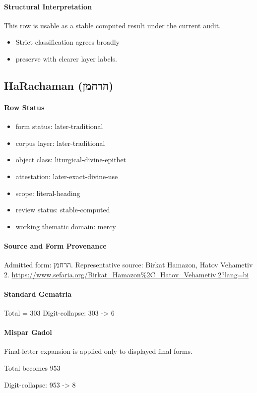 \paragraph{Structural Interpretation}
This row is usable as a stable computed result under the current audit.

\begin{itemize}
\item Strict classification agrees broadly
\item preserve with clearer layer labels.
\end{itemize}

\subsection{HaRachaman (הרחמן)}
\paragraph{Row Status}
\begin{itemize}
\item form status: later-traditional
\item corpus layer: later-traditional
\item object class: liturgical-divine-epithet
\item attestation: later-exact-divine-use
\item scope: literal-heading
\item review status: stable-computed
\item working thematic domain: mercy
\end{itemize}
\paragraph{Source and Form Provenance}
Admitted form: הרחמן.
Representative source: Birkat Hamazon, Hatov Vehametiv 2.
\url{https://www.sefaria.org/Birkat_Hamazon%2C_Hatov_Vehametiv.2?lang=bi}
\paragraph{Standard Gematria}
Total = 303
Digit-collapse: 303 -> 6
\paragraph{Mispar Gadol}
Final-letter expansion is applied only to displayed final forms.

Total becomes 953

Digit-collapse: 953 -> 8
